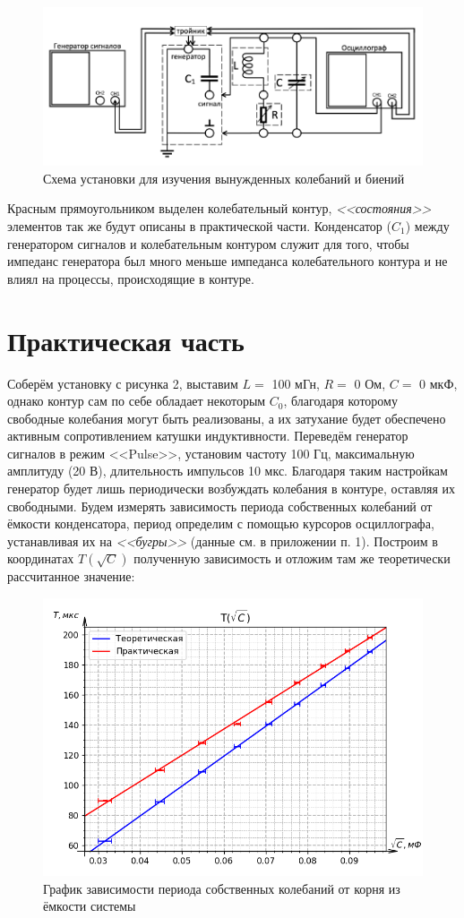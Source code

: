 \documentclass[a4paper,12pt]{extarticle}
\begin{document}
\begin{figure}[h!]
    \centering
    \includegraphics[width=0.8\linewidth]{ustan2.png}
    \caption{Схема установки для изучения вынужденных колебаний и биений}
\end{figure}

Красным прямоугольником выделен колебательный контур, \textit{<<состояния>>} элементов так же будут описаны в практической части. Конденсатор ($C_1$) между генератором сигналов и колебательным контуром служит для того, чтобы импеданс генератора был много меньше импеданса колебательного контура и не влиял на процессы, происходящие в контуре.

\newpage
\section{Практическая часть}
Соберём установку с рисунка 2, выставим $L =$ 100 мГн, $R =$ 0 Ом, $C =$ 0 мкФ, однако контур сам по себе обладает некоторым $C_0$, благодаря которому свободные колебания могут быть реализованы, а их затухание будет обеспечено активным сопротивлением катушки индуктивности. Переведём генератор сигналов в режим <<Pulse>>, установим частоту 100 Гц, максимальную амплитуду (20 В), длительность импульсов 10 мкс. Благодаря таким настройкам генератор будет лишь периодически возбуждать колебания в контуре, оставляя их свободными. Будем измерять зависимость периода собственных колебаний от ёмкости конденсатора, период определим с помощью курсоров осциллографа, устанавливая их на \textit{<<бугры>>} (данные см. в приложении п. 1). Построим в координатах $T(\sqrt{C})$ полученную зависимость и отложим там же теоретически рассчитанное значение:

\begin{figure}[h!]
    \centering
    \includegraphics[width=0.8\linewidth]{T(C).png}
    \caption{График зависимости периода собственных колебаний от корня из ёмкости системы}
\end{figure}
\end{document}
